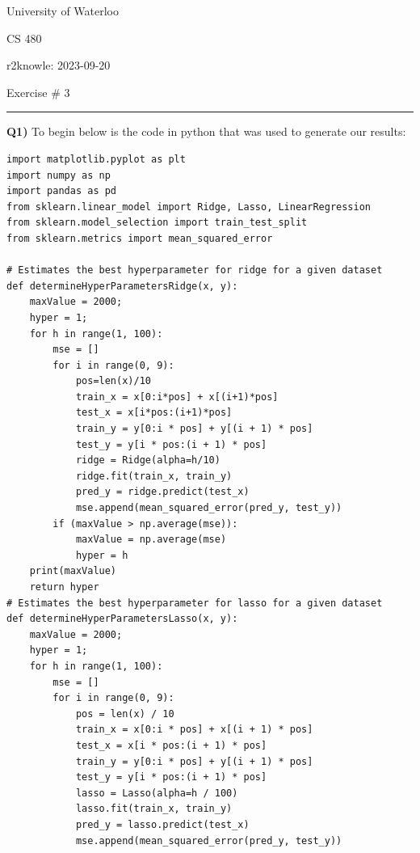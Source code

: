 \documentclass{article}
\begin{document}
\begin{titlepage}
	\setlength{\parindent}{0pt}
	\large

\vspace*{-2cm}



University of Waterloo \par
CS 480 \par
\vspace{0.05cm}
r2knowle: 2023-09-20
\vspace{0.2cm}

{\huge Exercise \# 3 \par}
\hrule

\vspace{0.5cm}
\textbf{Q1)} To begin below is the code in python that was used to generate our results:

\begin{lstlisting}
import matplotlib.pyplot as plt
import numpy as np
import pandas as pd
from sklearn.linear_model import Ridge, Lasso, LinearRegression
from sklearn.model_selection import train_test_split
from sklearn.metrics import mean_squared_error

# Estimates the best hyperparameter for ridge for a given dataset
def determineHyperParametersRidge(x, y):
    maxValue = 2000;
    hyper = 1;
    for h in range(1, 100):
        mse = []
        for i in range(0, 9):
            pos=len(x)/10
            train_x = x[0:i*pos] + x[(i+1)*pos]
            test_x = x[i*pos:(i+1)*pos]
            train_y = y[0:i * pos] + y[(i + 1) * pos]
            test_y = y[i * pos:(i + 1) * pos]
            ridge = Ridge(alpha=h/10)
            ridge.fit(train_x, train_y)
            pred_y = ridge.predict(test_x)
            mse.append(mean_squared_error(pred_y, test_y))
        if (maxValue > np.average(mse)):
            maxValue = np.average(mse)
            hyper = h
    print(maxValue)
    return hyper
# Estimates the best hyperparameter for lasso for a given dataset
def determineHyperParametersLasso(x, y):
    maxValue = 2000;
    hyper = 1;
    for h in range(1, 100):
        mse = []
        for i in range(0, 9):
            pos = len(x) / 10
            train_x = x[0:i * pos] + x[(i + 1) * pos]
            test_x = x[i * pos:(i + 1) * pos]
            train_y = y[0:i * pos] + y[(i + 1) * pos]
            test_y = y[i * pos:(i + 1) * pos]
            lasso = Lasso(alpha=h / 100)
            lasso.fit(train_x, train_y)
            pred_y = lasso.predict(test_x)
            mse.append(mean_squared_error(pred_y, test_y))


\end{lstlisting}
\end{titlepage}
\end{document}

